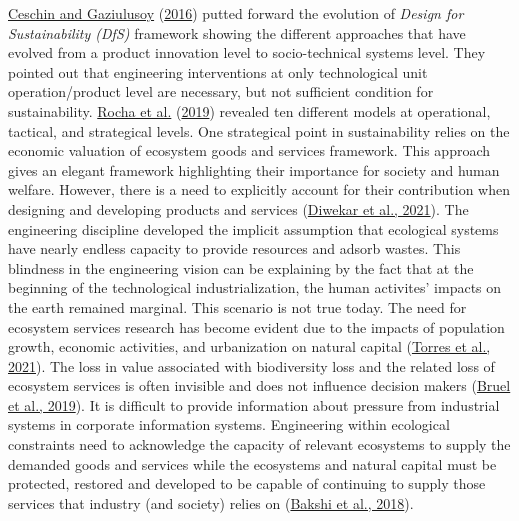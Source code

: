 \documentclass[]{elsarticle} %
\begin{document}
\protect\hyperlink{ref-Ceschin2016}{Ceschin and Gaziulusoy} (\protect\hyperlink{ref-Ceschin2016}{2016}) putted forward the evolution of \emph{Design for Sustainability (DfS)} framework showing the different approaches that have evolved from a product innovation level to socio-technical systems level.
They pointed out that engineering interventions at only technological unit operation/product level are necessary, but not sufficient condition for sustainability.
\protect\hyperlink{ref-SousaRocha2019}{Rocha et al.} (\protect\hyperlink{ref-SousaRocha2019}{2019}) revealed ten different models at operational, tactical, and strategical levels.
One strategical point in sustainability relies on the economic valuation of ecosystem goods and services framework.
This approach gives an elegant framework highlighting their importance for society and human welfare.
However, there is a need to explicitly account for their contribution when designing and developing products and services (\protect\hyperlink{ref-Diwekar2021}{Diwekar et al., 2021}).
The engineering discipline developed the implicit assumption that ecological systems have nearly endless capacity to provide resources and adsorb wastes.
This blindness in the engineering vision can be explaining by the fact that at the beginning of the technological industrialization, the human activites' impacts on the earth remained marginal. This scenario is not true today.
The need for ecosystem services research has become evident due to the impacts of population growth, economic activities, and urbanization on natural capital (\protect\hyperlink{ref-Torres2021}{Torres et al., 2021}).
The loss in value associated with biodiversity loss and the related loss of ecosystem services is often invisible and does not influence decision makers (\protect\hyperlink{ref-Bruel2018}{Bruel et al., 2019}).
It is difficult to provide information about pressure from industrial systems in corporate information systems.
Engineering within ecological constraints need to acknowledge the capacity of relevant ecosystems to supply the demanded goods and services while the ecosystems and natural capital must be protected, restored and developed to be capable of continuing to supply those services that industry (and society) relies on (\protect\hyperlink{ref-Bakshi2018}{Bakshi et al., 2018}).
\end{document}
